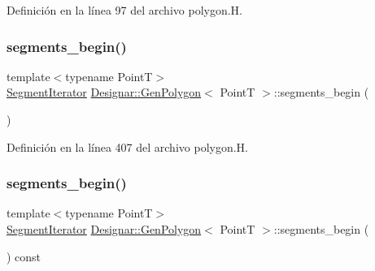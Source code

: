 Definición en la línea 97 del archivo polygon.\+H.

\mbox{\label{class_designar_1_1_gen_polygon_a6957491e673b75a7106de2a19dd20f2e}} 
\subsubsection{\texorpdfstring{segments\+\_\+begin()}{segments\_begin()}\hspace{0.1cm}{\footnotesize\ttfamily [1/2]}}
{\footnotesize\ttfamily template$<$typename PointT$>$ \\
\hyperlink{class_designar_1_1_gen_polygon_1_1_segment_iterator}{Segment\+Iterator} \hyperlink{class_designar_1_1_gen_polygon}{Designar\+::\+Gen\+Polygon}$<$ PointT $>$\+::segments\+\_\+begin (\begin{DoxyParamCaption}{ }\end{DoxyParamCaption})\hspace{0.3cm}{\ttfamily [inline]}}



Definición en la línea 407 del archivo polygon.\+H.

\mbox{\label{class_designar_1_1_gen_polygon_a66bce31d11cd12f7f3d6731d3d23bb77}} 
\subsubsection{\texorpdfstring{segments\+\_\+begin()}{segments\_begin()}\hspace{0.1cm}{\footnotesize\ttfamily [2/2]}}
{\footnotesize\ttfamily template$<$typename PointT$>$ \\
\hyperlink{class_designar_1_1_gen_polygon_1_1_segment_iterator}{Segment\+Iterator} \hyperlink{class_designar_1_1_gen_polygon}{Designar\+::\+Gen\+Polygon}$<$ PointT $>$\+::segments\+\_\+begin (\begin{DoxyParamCaption}{ }\end{DoxyParamCaption}) const\hspace{0.3cm}{\ttfamily [inline]}}



